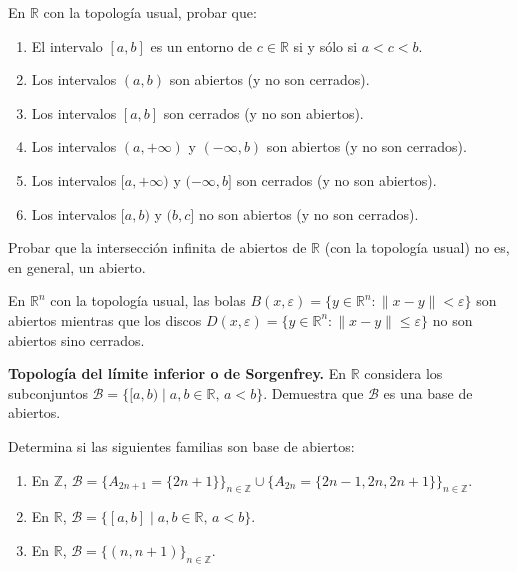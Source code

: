 \begin{ejer}[19]
En $\mathbb{R}$ con la topología usual, probar que:
\begin{enumerate}
    \item[a)] El intervalo $[a,b]$ es un entorno de $c \in \mathbb{R}$ si y sólo si $a < c < b$.
    \item[b)] Los intervalos $(a,b)$ son abiertos (y no son cerrados).
    \item[c)] Los intervalos $[a,b]$ son cerrados (y no son abiertos).
    \item[d)] Los intervalos $(a, +\infty)$ y $(-\infty, b)$ son abiertos (y no son cerrados).
    \item[e)] Los intervalos $[a, +\infty)$ y $(-\infty, b]$ son cerrados (y no son abiertos).
    \item[f)] Los intervalos $[a,b)$ y $(b,c]$ no son abiertos (y no son cerrados).
\end{enumerate}
\end{ejer}

\begin{ejer}[20]
Probar que la intersección infinita de abiertos de $\mathbb{R}$ (con la topología usual) no es, en general, un abierto.
\end{ejer}

\begin{ejer}[21]
En $\mathbb{R}^n$ con la topología usual, las bolas $B(x, \varepsilon) = \{y \in \mathbb{R}^n : \|x - y\| < \varepsilon\}$ son abiertos mientras que los discos $D(x, \varepsilon) = \{y \in \mathbb{R}^n : \|x - y\| \le \varepsilon\}$ no son abiertos sino cerrados.
\end{ejer}

\begin{ejer}[22]
\textbf{Topología del límite inferior o de Sorgenfrey.} En $\mathbb{R}$ considera los subconjuntos $\mathcal{B} = \{[a,b) \mid a,b \in \mathbb{R}, \, a < b\}$. Demuestra que $\mathcal{B}$ es una base de abiertos.
\end{ejer}

\begin{ejer}[23]
Determina si las siguientes familias son base de abiertos:
\begin{enumerate}
    \item[a)] En $\mathbb{Z}$, $\mathcal{B} = \{A_{2n+1} = \{2n+1\}\}_{n \in \mathbb{Z}} \cup \{A_{2n} = \{2n-1, 2n, 2n+1\}\}_{n \in \mathbb{Z}}$.
    \item[b)] En $\mathbb{R}$, $\mathcal{B} = \{[a,b] \mid a,b \in \mathbb{R}, \, a < b\}$.
    \item[c)] En $\mathbb{R}$, $\mathcal{B} = \{(n, n+1)\}_{n \in \mathbb{Z}}$.
\end{enumerate}
\end{ejer}

